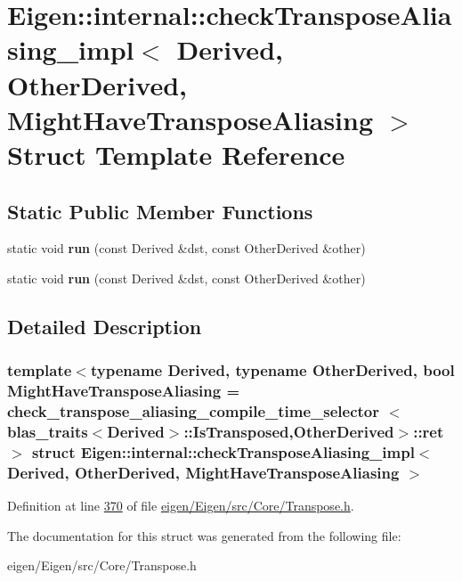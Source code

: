 \hypertarget{struct_eigen_1_1internal_1_1check_transpose_aliasing__impl}{}\section{Eigen\+:\+:internal\+:\+:check\+Transpose\+Aliasing\+\_\+impl$<$ Derived, Other\+Derived, Might\+Have\+Transpose\+Aliasing $>$ Struct Template Reference}
\label{struct_eigen_1_1internal_1_1check_transpose_aliasing__impl}
\subsection*{Static Public Member Functions}
\begin{DoxyCompactItemize}
\item 
\mbox{\label{struct_eigen_1_1internal_1_1check_transpose_aliasing__impl_a01cee326e5f97de5675845081f35a9ab}} 
static void {\bfseries run} (const Derived \&dst, const Other\+Derived \&other)
\item 
\mbox{\label{struct_eigen_1_1internal_1_1check_transpose_aliasing__impl_a01cee326e5f97de5675845081f35a9ab}} 
static void {\bfseries run} (const Derived \&dst, const Other\+Derived \&other)
\end{DoxyCompactItemize}


\subsection{Detailed Description}
\subsubsection*{template$<$typename Derived, typename Other\+Derived, bool Might\+Have\+Transpose\+Aliasing = check\+\_\+transpose\+\_\+aliasing\+\_\+compile\+\_\+time\+\_\+selector $<$blas\+\_\+traits$<$\+Derived$>$\+::\+Is\+Transposed,\+Other\+Derived$>$\+::ret$>$\newline
struct Eigen\+::internal\+::check\+Transpose\+Aliasing\+\_\+impl$<$ Derived, Other\+Derived, Might\+Have\+Transpose\+Aliasing $>$}



Definition at line \hyperlink{eigen_2_eigen_2src_2_core_2_transpose_8h_source_l00370}{370} of file \hyperlink{eigen_2_eigen_2src_2_core_2_transpose_8h_source}{eigen/\+Eigen/src/\+Core/\+Transpose.\+h}.



The documentation for this struct was generated from the following file\+:\begin{DoxyCompactItemize}
\item 
eigen/\+Eigen/src/\+Core/\+Transpose.\+h\end{DoxyCompactItemize}
